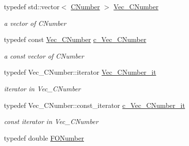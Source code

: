 \begin{Indent}
\begin{DoxyCompactItemize}
typedef std\+::vector$<$ \mbox{\hyperlink{class_s_m_spp__di__unipi__it_1_1_m_c_f_block_a24d0627ba8213afe1ec4ebeb4508e8f1}{C\+Number}} $>$ \mbox{\hyperlink{class_s_m_spp__di__unipi__it_1_1_m_c_f_block_a9a7c9495f1f1feab22f3c556b70f60f0}{Vec\+\_\+\+C\+Number}}
\begin{DoxyCompactList}\small\item\em a vector of C\+Number \end{DoxyCompactList}\item 
\mbox{\label{class_s_m_spp__di__unipi__it_1_1_m_c_f_block_ad42538e79f9abbdf18061bccc05edcd6}} 
typedef const \mbox{\hyperlink{class_s_m_spp__di__unipi__it_1_1_m_c_f_block_a9a7c9495f1f1feab22f3c556b70f60f0}{Vec\+\_\+\+C\+Number}} \mbox{\hyperlink{class_s_m_spp__di__unipi__it_1_1_m_c_f_block_ad42538e79f9abbdf18061bccc05edcd6}{c\+\_\+\+Vec\+\_\+\+C\+Number}}
\begin{DoxyCompactList}\small\item\em a const vector of C\+Number \end{DoxyCompactList}\item 
\mbox{\label{class_s_m_spp__di__unipi__it_1_1_m_c_f_block_ae4702c5fa0f04689fc034292c2f7aa87}} 
typedef Vec\+\_\+\+C\+Number\+::iterator \mbox{\hyperlink{class_s_m_spp__di__unipi__it_1_1_m_c_f_block_ae4702c5fa0f04689fc034292c2f7aa87}{Vec\+\_\+\+C\+Number\+\_\+it}}
\begin{DoxyCompactList}\small\item\em iterator in Vec\+\_\+\+C\+Number \end{DoxyCompactList}\item 
\mbox{\label{class_s_m_spp__di__unipi__it_1_1_m_c_f_block_aa2211b659beb942cfb7618c11033831e}} 
typedef Vec\+\_\+\+C\+Number\+::const\+\_\+iterator \mbox{\hyperlink{class_s_m_spp__di__unipi__it_1_1_m_c_f_block_aa2211b659beb942cfb7618c11033831e}{c\+\_\+\+Vec\+\_\+\+C\+Number\+\_\+it}}
\begin{DoxyCompactList}\small\item\em const iterator in Vec\+\_\+\+C\+Number \end{DoxyCompactList}\item 
typedef double \mbox{\hyperlink{class_s_m_spp__di__unipi__it_1_1_m_c_f_block_af5ee7b3099b0bc780a6a4b43629488fa}{F\+O\+Number}}
\item 

\end{DoxyCompactItemize}
\end{Indent}
